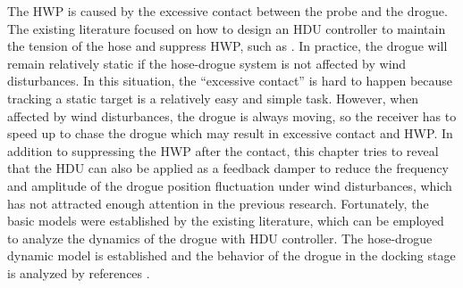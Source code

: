 The HWP is caused by the excessive contact between the probe and the
drogue. The existing literature focused on how to design an HDU controller
to maintain the tension of the hose and suppress HWP, such as \cite{Vassberg2003,Wang2014}.
In practice, the drogue will remain relatively static if the hose-drogue
system is not affected by wind disturbances. In this situation, the
\textquotedblleft excessive contact\textquotedblright{} is hard to
happen because tracking a static target is a relatively easy and simple
task. However, when affected by wind disturbances, the drogue is always
moving, so the receiver has to speed up to chase the drogue which
may result in excessive contact and HWP. In addition to suppressing
the HWP after the contact, this chapter tries to reveal that the HDU
can also be applied as a feedback damper to reduce the frequency and
amplitude of the drogue position fluctuation under wind disturbances,
which has not attracted enough attention in the previous research.
Fortunately, the basic models were established by the existing literature,
which can be employed to analyze the dynamics of the drogue with HDU
controller. The hose-drogue dynamic model is established and the behavior
of the drogue in the docking stage is analyzed by references \cite{Ro2011,Vassberg2003,vassberg2005numerical,Ro2009,Zhu2006}.

